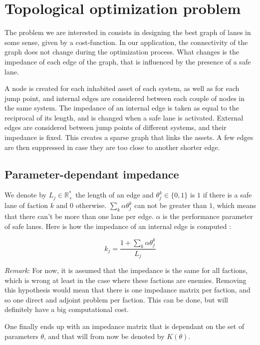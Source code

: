 \documentclass[11pt,a4paper]{article}  %
\begin{document}
\section{Topological optimization problem}

The problem we are interested in consists in designing the best graph of lanes in some sense, given by a cost-function. In our application, the connectivity of the graph does not change during the optimization process. What changes is the impedance of each edge of the graph, that is influenced by the presence of a safe lane.

A node is created for each inhabited asset of each system, as well as for each jump point, and internal edges are considered between each couple of nodes in the same system. The impedance of an internal edge is taken as equal to the reciprocal of its length, and is changed when a safe lane is activated. External edges are considered between jump points of different systems, and their impedance is fixed. This creates a sparse graph that links the assets. A few edges are then suppressed in case they are too close to another shorter edge.

\subsection{Parameter-dependant impedance}

We denote by $L_j\in\mathbb{R}^*_+$ the length of an edge and $\theta_j^k\in\{0,1\}$ is $1$ if there is a safe lane of faction $k$ and $0$ otherwise. $\sum_k\alpha\theta_j^k$ can not be greater than $1$, which means that there can't be more than one lane per edge. $\alpha$ is the performance parameter of safe lanes. Here is how the impedance of an internal edge is computed :

\begin{equation}\label{eqn:stiff}
k_j = \dfrac{1+\sum_k\alpha\theta_j^k}{L_j}
\end{equation}

\textit{Remark}: For now, it is assumed that the impedance is the same for all factions, which is wrong at least in the case where these factions are enemies. Removing this hypothesis would mean that there is one impedance matrix per faction, and so one direct and adjoint problem per faction. This can be done, but will definitely have a big computational cost.

One finally ends up with an impedance matrix that is dependant on the set of parameters $\theta$, and that will from now be denoted by $K(\theta)$.
\end{document}
